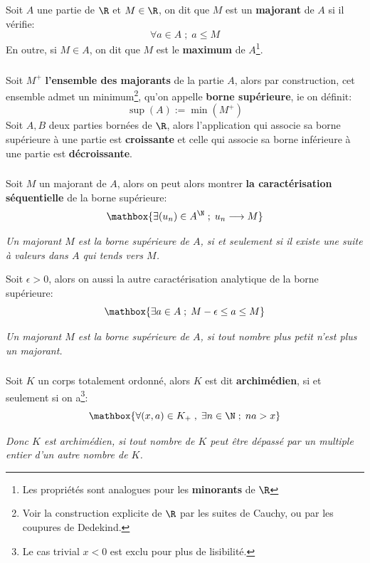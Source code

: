 \chapter*{} %

Soit \(A\) une partie de \(\R\) et \(M \in \R\), on dit que \(M\) est un \textbf{majorant} de \(A\) si il vérifie:
\[
    \forall a \in A \; ; \; a \leq M
\]
En outre, si \(M \in A\), on dit que \(M\) est le \textbf{maximum} de \(A\)\footnote[1]{Les propriétés sont analogues pour les \textbf{minorants} de \(\R\)}. 

\subsection*{}
Soit \(M^+\) \textbf{l'ensemble des majorants} de la partie \(A\), alors par construction, cet ensemble admet un minimum\footnote[2]{Voir la construction explicite de \(\R\) par les suites de Cauchy, ou par les coupures de Dedekind.}, qu'on appelle \textbf{borne supérieure}, ie on définit:
\[
    \sup(A) := \min(M^+)
\]
Soit \(A, B\) deux parties bornées de \(\R\), alors l'application qui associe sa borne supérieure à une partie est \textbf{croissante} et celle qui associe sa borne inférieure à une partie est \textbf{décroissante}.
\subsection*{}
Soit \(M\) un majorant de \(A\), alors on peut alors montrer \textbf{la caractérisation séquentielle} de la borne supérieure:
\[
    \mathbox{\exists (u_n) \in A^\N \; ; \; u_n \longrightarrow M}
\]
\begin{center}
    \textit{
        Un majorant \(M\) est la borne supérieure de \(A\), si et seulement si il existe une suite à valeurs dans \(A\) qui tends vers \(M\).
    }
\end{center}
Soit \(\epsilon > 0\), alors on aussi la autre caractérisation analytique de la borne supérieure:  
\[
    \mathbox{\exists a \in A \; ; \; M - \epsilon \leq a \leq M}
\]
\begin{center}
    \textit{
        Un majorant \(M\) est la borne supérieure de \(A\), si tout nombre plus petit n'est plus un majorant.
    }
\end{center}

\subsection*{}
Soit \(K\) un corps totalement ordonné, alors \(K\) est dit \textbf{archimédien}, si et seulement si on a\footnote[3]{Le cas trivial \(x < 0\) est exclu pour plus de lisibilité.}:
\[
    \mathbox{
        \forall (x, a) \in K_+ \; , \; \exists n \in \N \; ; \; na > x
    }
\]
\begin{center}
    \textit{
        Donc \(K\) est archimédien, si tout nombre de \(K\) peut être dépassé par un multiple entier\+
        d'un autre nombre de \(K\).
    }
\end{center}

